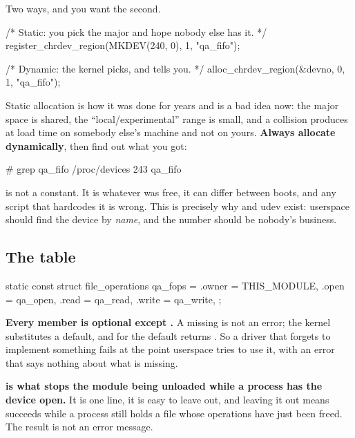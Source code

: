 Two ways, and you want the second.

\begin{ccode}
/* Static: you pick the major and hope nobody else has it. */
register_chrdev_region(MKDEV(240, 0), 1, "qa_fifo");

/* Dynamic: the kernel picks, and tells you. */
alloc_chrdev_region(&devno, 0, 1, "qa_fifo");
\end{ccode}

\noindent Static allocation is how it was done for years and is a bad idea now: the major space is
shared, the ``local/experimental'' range is small, and a collision produces  at load
time on somebody else's machine and not on yours. \textbf{Always allocate dynamically}, then find
out what you got:

\begin{console}
# grep qa_fifo /proc/devices
243 qa_fifo
\end{console}

 is not a constant. It is whatever was free, it can differ between boots, and any
script that hardcodes it is wrong. This is precisely why  and udev exist:
userspace should find the device by \emph{name}, and the number should be nobody's business.

\subsection{The table}
\label{c5:app:a3}

\begin{ccode}
static const struct file_operations qa_fops = {
        .owner   = THIS_MODULE,
        .open    = qa_open,
        .read    = qa_read,
        .write   = qa_write,
};
\end{ccode}

\noindent \textbf{Every member is optional except .} A missing  is not an
error; the kernel substitutes a default, and for  the default returns . So
a driver that forgets to implement something fails at the point userspace tries to use it, with an
error that says nothing about what is missing.

\textbf{ is what stops the module being unloaded while a process has the
device open.} It is one line, it is easy to leave out, and leaving it out means 
succeeds while a process still holds a file whose operations have just been freed. The result is not
an error message.

